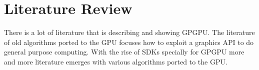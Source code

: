\chapter{Literature Review}\label{ch:literature_review}






There is a lot of literature that is describing and showing \gls{GPGPU}. The literature
of old algorithms ported to the \gls{GPU} focuses how to exploit a graphics
\gls{API} to do general purpose computing. With the rise of \glspl{SDK}
specially for \gls{GPGPU} more and more literature emerges with various 
algorithms ported to the \gls{GPU}. 

